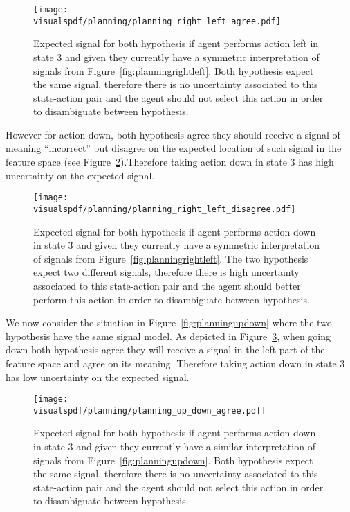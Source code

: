 \begin{figure}[!htbp]
  \centering
  \texttt{[image: \\visualspdf/planning/planning\_right\_left\_agree.pdf]}
  \caption{Expected signal for both hypothesis if agent performs action left in state 3 and given they currently have a symmetric interpretation of signals from Figure~\ref{fig:planningrightleft}. Both hypothesis expect the same signal, therefore there is no uncertainty associated to this state-action pair and the agent should not select this action in order to disambiguate between hypothesis.}
  \label{fig:uncertaintysignalrightleftagree}
\end{figure}

However for action down, both hypothesis agree they should receive a signal of meaning ``incorrect'' but disagree on the expected location of such signal in the feature space (see Figure~\ref{fig:uncertaintysignalrightleftdisagree}).Therefore taking action down in state 3 has high uncertainty on the expected signal.

\begin{figure}[!htbp]
  \centering
  \texttt{[image: \\visualspdf/planning/planning\_right\_left\_disagree.pdf]}
  \caption{Expected signal for both hypothesis if agent performs action down in state 3 and given they currently have a symmetric interpretation of signals from Figure~\ref{fig:planningrightleft}. The two hypothesis expect two different signals, therefore there is high uncertainty associated to this state-action pair and the agent should better perform this action in order to disambiguate between hypothesis.}
  \label{fig:uncertaintysignalrightleftdisagree}
\end{figure}


We now consider the situation in Figure~\ref{fig:planningupdown} where the two hypothesis have the same signal model. As depicted in Figure~\ref{fig:uncertaintysignalupdownagree}, when going down both hypothesis agree they will receive a signal in the left part of the feature space and agree on its meaning. Therefore taking action down in state 3 has low uncertainty on the expected signal.

\begin{figure}[!htbp]
  \centering
  \texttt{[image: \\visualspdf/planning/planning\_up\_down\_agree.pdf]}
  \caption{Expected signal for both hypothesis if agent performs action down in state 3 and given they currently have a similar interpretation of signals from Figure~\ref{fig:planningupdown}. Both hypothesis expect the same signal, therefore there is no uncertainty associated to this state-action pair and the agent should not select this action in order to disambiguate between hypothesis.}
  \label{fig:uncertaintysignalupdownagree}
\end{figure}

